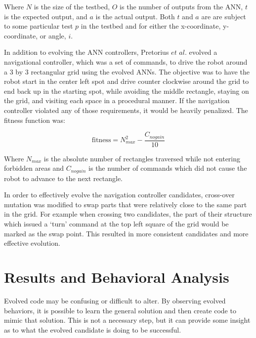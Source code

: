 \documentclass{sig-alternate}
\begin{document}
  Where $N$ is the size of the testbed, $O$ is the number of outputs from the ANN, $t$ is the expected output, and $a$ is the actual output. Both $t$ and $a$ are are subject to some particular test $p$ in the testbed and for either the x-coordinate, y-coordinate, or angle, $i$.
  
  In addition to evolving the ANN controllers, Pretorius $et$ $al.$ evolved a  navigational controller, which was a set of commands, to drive the robot around a 3 by 3 rectangular grid using the evolved ANNs. The objective was to have the robot start in the center left spot and drive counter clockwise around the grid to end back up in the starting spot, while avoiding the middle rectangle, staying on the grid, and visiting each space in a procedural manner. If the navigation controller violated any of those requirements, it would be heavily penalized. The fitness function was:


\[
  \textrm{fitness} = N_{max}^2 - \frac{C_{nogain}}{10}
\] 

Where $N_{max}$ is the absolute number of rectangles traversed while not entering forbidden areas and $C_{nogain}$ is the number of commands which did not cause the robot to advance to the next rectangle.

	In order to effectively evolve the navigation controller candidates, cross-over mutation was modified to swap parts that were relatively close to the same part in the grid. For example when crossing two candidates, the part of their structure which issued a `turn' command at the top left square of the grid would be marked as the swap point. This resulted in more consistent candidates and more effective evolution. 
\section{Results and Behavioral Analysis}\label{behavior}

  Evolved code may be confusing or difficult to alter. By observing evolved behaviors, it is possible to learn the general solution and then create code to mimic that solution. This is not a necessary step, but it can provide some insight as to what the evolved candidate is doing to be successful.
\end{document}
